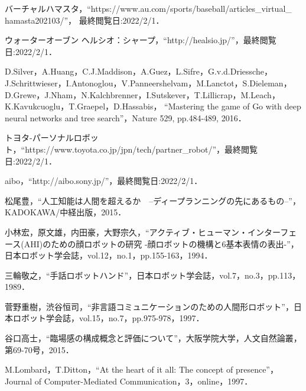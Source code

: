\renewcommand{\bibname}{参考文献}

\begin{thebibliography}{27} %


バーチャルハマスタ，``https://www.au.com/sports/baseball/articles\_virtual\_\\hamasta202103/''，
最終閲覧日:2022/2/1．

ウォーターオーブン ヘルシオ：シャープ，``http://healsio.jp/''，最終閲覧日:2022/2/1．

D.Silver，A.Huang，C.J.Maddison，A.Guez，L.Sifre，G.v.d.Driessche，J.Schrittwieser，I.Antonoglou，V.Panneershelvam，M.Lanctot，S.Dieleman，
D.Grewe，J.Nham，N.Kalchbrenner，I.Sutskever，T.Lillicrap，M.Leach，K.Kavukcuoglu，T.Graepel，D.Hassabis，
``Mastering the game of Go with deep neural networks and tree search''，Nature 529, pp.484-489, 2016．

トヨタ-パーソナルロボット，``https://www.toyota.co.jp/jpn/tech/partner\_robot/''，最終閲覧日:2022/2/1．

aibo，``http://aibo.sony.jp/''，最終閲覧日:2022/2/1．

松尾豊，``人工知能は人間を超えるか　--ディープランニングの先にあるもの--''，KADOKAWA/中経出版，2015．

小林宏，原文雄，内田豪，大野宗久，``アクティブ・ヒューマン・インターフェース(AHI)のための顔ロボットの研究 
-顔ロボットの機構と6基本表情の表出-''，日本ロボット学会誌，vol.12，no.1，pp.155-163，1994．

三輪敬之，``手話ロボットハンド''，日本ロボット学会誌，vol.7，no.3，pp.113，1989．

菅野重樹，渋谷恒司，``非言語コミュニケーションのための人間形ロボット''，日本ロボット学会誌，vol.15，no.7，pp.975-978，1997．


谷口高士，``臨場感の構成概念と評価について''，大阪学院大学，人文自然論叢，
第69-70号，2015．

M.Lombard，T.Ditton，``At the heart of it all: The concept of presence''，Journal of Computer-Mediated Communication，3，online，1997．


\end{thebibliography}
